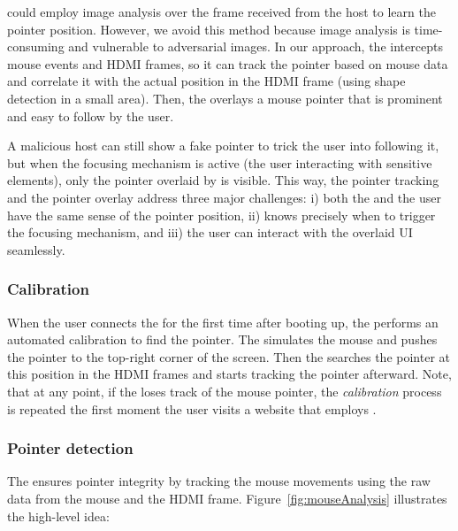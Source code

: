 \device could employ image analysis over the frame received from the host to learn the pointer position. However, we avoid this method because image analysis is time-consuming and vulnerable to adversarial images. In our approach, the \device intercepts mouse events and HDMI frames, so it can track the pointer based on mouse data and correlate it with the actual position in the HDMI frame (using shape detection in a small area). Then, the \device overlays a mouse pointer that is prominent and easy to follow by the user. 

A malicious host can still show a fake pointer to trick the user into following it, but when the focusing mechanism is active (the user interacting with sensitive elements), only the pointer overlaid by \device is visible. This way, the pointer tracking and the pointer overlay address three major challenges: i) both the \device and the user have the same sense of the pointer position, ii) \device knows precisely when to trigger the focusing mechanism, and iii) the user can interact with the overlaid UI seamlessly. 


\subsubsection{\bfseries Calibration}\label{sec:systemDesign:analysis:calibration} When the user connects the \device for the first time after booting up, the \device performs an automated calibration to find the pointer. The \device simulates the mouse and pushes the pointer to the top-right corner of the screen. Then the \device searches the pointer at this position in the HDMI frames
and starts tracking the pointer afterward. Note, that at any point, if the \device loses track of the mouse pointer, the \emph{calibration} process is repeated the first moment the user visits a website that employs \name.

\subsubsection{\bfseries Pointer detection} The \device ensures pointer integrity by tracking the mouse movements using the raw data from the mouse and the HDMI frame.  Figure~\ref{fig:mouseAnalysis} illustrates the high-level idea: 

